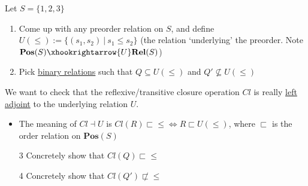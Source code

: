 
Let $S=\{1,2,3\}$
    \begin{enumerate}
      \item Come up with any preorder relation on $S$, and define $U(\leq):=\{(s_1,s_2)\ |\ s_1 \leq s_2\}$ (the relation `underlying' the preorder. Note $\mathbf{Pos}(S) \xhookrightarrow{U} \mathbf{Rel}(S)$)
      \item Pick \href{doc/1 math/Seven Sketches in Compositionality/Chapter 1: Generative Effects/2 What is order/Relation}{binary relations} such that $Q \subseteq U(\leq)$ and $Q' \not \subseteq U(\leq)$
    \end{enumerate}
    We want to check that the reflexive/transitive closure operation $Cl$ is really \href{doc/1 math/Seven Sketches in Compositionality/Chapter 1: Generative Effects/6 Galois connections/1 Definition and examples/Galois connection}{left adjoint} to the underlying relation $U$.
    \begin{itemize}
      \item The meaning of $Cl \dashv U$ is $Cl(R) \sqsubset \leq \iff R \sqsubset U(\leq)$, where $\sqsubset$ is the order relation on $\mathbf{Pos}(S)$
    \end{itemize}

    \begin{enumerate}
      \item[3] Concretely show that $Cl(Q) \sqsubset \leq$
      \item[4] Concretely show that $Cl(Q') \not \sqsubset \leq$
    \end{enumerate}